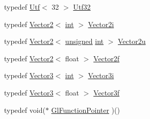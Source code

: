 \begin{DoxyCompactItemize}
\item 
typedef \hyperlink{classsf_1_1_utf}{Utf}$<$ 32 $>$ \hyperlink{namespacesf_ae8ddf58bb1d012fc076ea9d4f8ec2feb}{Utf32}
\item 
typedef \hyperlink{classsf_1_1_vector2}{Vector2}$<$ \hyperlink{term__entry_8h_ad65b480f8c8270356b45a9890f6499ae}{int} $>$ \hyperlink{namespacesf_a0eed58bf66694ebbc55f72ca7de840d9}{Vector2i}
\item 
typedef \hyperlink{classsf_1_1_vector2}{Vector2}$<$ \hyperlink{curses_8priv_8h_aca40206900cfc164654362fa8d4ad1e6}{unsigned} \hyperlink{term__entry_8h_ad65b480f8c8270356b45a9890f6499ae}{int} $>$ \hyperlink{namespacesf_a41039649eb65ea7646e2b97cfe124b4f}{Vector2u}
\item 
typedef \hyperlink{classsf_1_1_vector2}{Vector2}$<$ float $>$ \hyperlink{namespacesf_a80cea3c46537294fd1d8d428566ad8b2}{Vector2f}
\item 
typedef \hyperlink{classsf_1_1_vector3}{Vector3}$<$ \hyperlink{term__entry_8h_ad65b480f8c8270356b45a9890f6499ae}{int} $>$ \hyperlink{namespacesf_ae33ba51125c097a0aa1b32e20b6e96cd}{Vector3i}
\item 
typedef \hyperlink{classsf_1_1_vector3}{Vector3}$<$ float $>$ \hyperlink{namespacesf_a36e44d9e6d8f649703698ec9d24ac052}{Vector3f}
\item 
typedef void($\ast$ \hyperlink{namespacesf_ad4f831952db30b6fd35330c7af581737}{Gl\-Function\-Pointer} )()
\end{DoxyCompactItemize}
